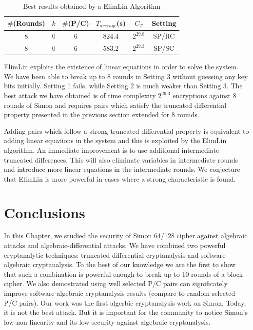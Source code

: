 \begin{table}[!h]
\caption{Best results obtained by a ElimLin Algorithm}\label{tab:SimonElimlin} \centering
\begin{tabular}{|c|c|c|c|c|c|}
  \hline
  $\#$(Rounds) & $k$ & $\#$(P/C) & $T_{average}$(s) & $C_T$ & Setting \\
  \hline
  8 & 0 & 6 & 824.4 & $2^{29.8}$ & SP/RC \\
 \hline
 8 & 0 & 6 & 583.2 & $2^{29.3}$ & SP/SC \\
  \hline
\end{tabular}
\end{table}

ElimLin exploits the existence of linear equations in order to solve the system. We have been able to break up to 8 rounds in Setting 3 without guessing any key bits
initially. Setting 1 fails, while Setting 2 is much weaker than Setting 3. The best
attack we have obtained is of time complexity $2^{29.3}$ encryptions against 8 rounds of Simon and requires pairs which satisfy
the truncated differential property presented in the previous section extended for 8 rounds.

Adding pairs which follow a strong truncated differential property is equivalent to adding linear equations in the system and this
is exploited by the ElimLin algorithm. An immediate improvement is to use additional intermediate truncated differences.
This will also eliminate variables in intermediate rounds and introduce more linear
equations in the intermediate rounds. We conjecture that ElimLin is more powerful
in cases where a strong characteristic is found.

\section{Conclusions}
In this Chapter, we studied the security of Simon 64/128 cipher against algebraic attacks and algebraic-differential attacks. We have combined two powerful cryptanalytic techniques: truncated differential cryptanalysis and software algebraic
cryptanalysis. To the best of our knowledge we are the first to show
that such a combination is powerful enough to break up to 10 rounds of a
block cipher. We also demostrated using well selected P/C pairs can significately improve software algebraic cryptanalysis results (compare to random selected P/C pairs). Our work was the first algerbic cryptanalysis work on Simon. Today, it is not the best attack. But it is important for the community to notice Simon's low non-linearity and its low security against algebraic cryptanalysis. 






